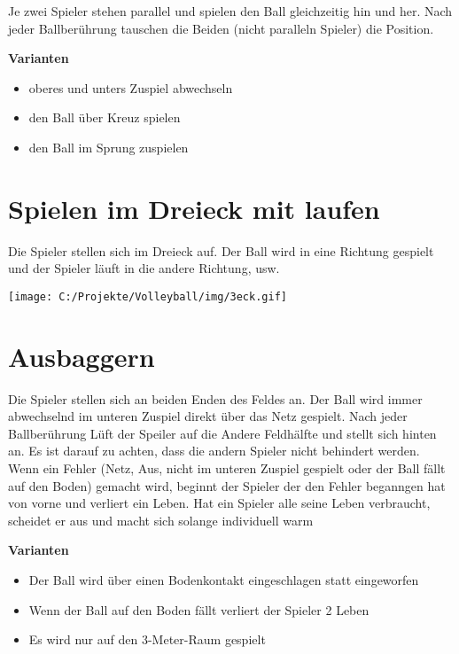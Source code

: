 \documentclass[]{book}
\providecommand{\tightlist}{%
  \setlength{\itemsep}{0pt}\setlength{\parskip}{0pt}}
\begin{document}
Je zwei Spieler stehen parallel und spielen den Ball gleichzeitig hin
und her. Nach jeder Ballberührung tauschen die Beiden (nicht paralleln
Spieler) die Position.

\textbf{Varianten}

\begin{itemize}
\tightlist
\item
  oberes und unters Zuspiel abwechseln
\item
  den Ball über Kreuz spielen
\item
  den Ball im Sprung zuspielen
\end{itemize}

\section{Spielen im Dreieck mit
laufen}\label{spielen-im-dreieck-mit-laufen}

Die Spieler stellen sich im Dreieck auf. Der Ball wird in eine Richtung
gespielt und der Spieler läuft in die andere Richtung, usw.

\texttt{[image: C:/Projekte/Volleyball/img/3eck.gif]}

\section{Ausbaggern}\label{ausbaggern}

Die Spieler stellen sich an beiden Enden des Feldes an. Der Ball wird
immer abwechselnd im unteren Zuspiel direkt über das Netz gespielt. Nach
jeder Ballberührung Lüft der Speiler auf die Andere Feldhälfte und
stellt sich hinten an. Es ist darauf zu achten, dass die andern Spieler
nicht behindert werden. Wenn ein Fehler (Netz, Aus, nicht im unteren
Zuspiel gespielt oder der Ball fällt auf den Boden) gemacht wird,
beginnt der Spieler der den Fehler beganngen hat von vorne und verliert
ein Leben. Hat ein Spieler alle seine Leben verbraucht, scheidet er aus
und macht sich solange individuell warm

\textbf{Varianten}

\begin{itemize}
\tightlist
\item
  Der Ball wird über einen Bodenkontakt eingeschlagen statt eingeworfen
\item
  Wenn der Ball auf den Boden fällt verliert der Spieler 2 Leben
\item
  Es wird nur auf den 3-Meter-Raum gespielt
\end{itemize}
\end{document}
